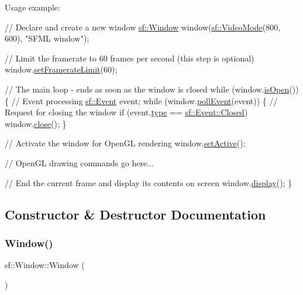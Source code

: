 Usage example\+: 
\begin{DoxyCode}
\textcolor{comment}{// Declare and create a new window}
\hyperlink{classsf_1_1_window}{sf::Window} window(\hyperlink{classsf_1_1_video_mode}{sf::VideoMode}(800, 600), \textcolor{stringliteral}{"SFML window"});

\textcolor{comment}{// Limit the framerate to 60 frames per second (this step is optional)}
window.\hyperlink{classsf_1_1_window_af4322d315baf93405bf0d5087ad5e784}{setFramerateLimit}(60);

\textcolor{comment}{// The main loop - ends as soon as the window is closed}
\textcolor{keywordflow}{while} (window.\hyperlink{classsf_1_1_window_ae873503db7d48157bb9cbf6129562bce}{isOpen}())
\{
   \textcolor{comment}{// Event processing}
   \hyperlink{classsf_1_1_event}{sf::Event} event;
   \textcolor{keywordflow}{while} (window.\hyperlink{classsf_1_1_window_a338e996585faf82e93069858e3b531b7}{pollEvent}(event))
   \{
       \textcolor{comment}{// Request for closing the window}
       \textcolor{keywordflow}{if} (event.\hyperlink{classsf_1_1_event_adf2f8044f713fd9d6019077b0d1ffe0a}{type} == \hyperlink{classsf_1_1_event_af41fa9ed45c02449030699f671331d4aa316e4212e083f1dce79efd8d9e9c0a95}{sf::Event::Closed})
           window.\hyperlink{classsf_1_1_window_a99d1e030387b0c26f5995670504fe7b5}{close}();
   \}

   \textcolor{comment}{// Activate the window for OpenGL rendering}
   window.\hyperlink{classsf_1_1_window_aaab549da64cedf74fa6f1ae7a3cc79e0}{setActive}();

   \textcolor{comment}{// OpenGL drawing commands go here...}

   \textcolor{comment}{// End the current frame and display its contents on screen}
   window.\hyperlink{classsf_1_1_window_adabf839cb103ac96cfc82f781638772a}{display}();
\}
\end{DoxyCode}
 

\subsection{Constructor \& Destructor Documentation}
\mbox{\label{classsf_1_1_window_a5359122166b4dc492c3d25caf08ccfc4}} 
\subsubsection{\texorpdfstring{Window()}{Window()}\hspace{0.1cm}{\footnotesize\ttfamily [1/3]}}
{\footnotesize\ttfamily sf\+::\+Window\+::\+Window (\begin{DoxyParamCaption}{ }\end{DoxyParamCaption})}



